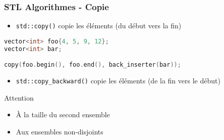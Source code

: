 \documentclass[C++.tex]{subfiles}
\begin{document}
\begin{frame}[fragile]
	\frametitle{STL Algorithmes - Copie}
	\begin{itemize}
		\item \lstinline|std::copy()| copie les éléments (du début vers la fin)
	\end{itemize}

	\begin{lstlisting}[language=C++]
vector<int> foo{4, 5, 9, 12};
vector<int> bar;

copy(foo.begin(), foo.end(), back_inserter(bar));\end{lstlisting}


	\begin{itemize}
		\item \lstinline|std::copy_backward()| copie les éléments (de la fin vers le début)
	\end{itemize}


	\begin{alertblock}{Attention}
		\begin{itemize}
			\item À la taille du second ensemble
			\item Aux ensembles non-disjoints
		\end{itemize}
	\end{alertblock}
\end{frame}
\end{document}
